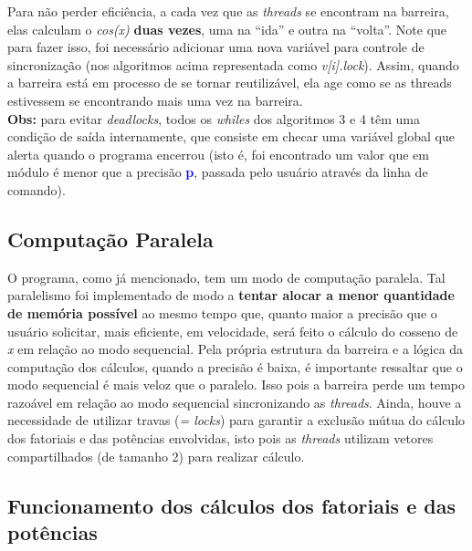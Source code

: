 \documentclass[11pt]{article}
\newcommand{\quotes}[1]{``#1''}
\begin{document}
Para não perder eficiência, a cada vez que as \textit{threads} se encontram na barreira, elas calculam o \textit{cos(x)} \textbf{duas vezes}, uma na \quotes{ida} e outra na \quotes{volta}. Note que para fazer isso, foi necessário adicionar uma nova variável para controle de sincronização (nos algoritmos acima representada como \textit{v[i].lock}). Assim, quando a barreira está em processo de se tornar reutilizável, ela age como se as threads estivessem se encontrando mais uma vez na barreira. \\
\textbf{Obs:} para evitar \textit{deadlocks}, todos os \textit{whiles} dos algoritmos 3 e 4 têm uma condição de saída internamente, que consiste em checar uma variável global que alerta quando o programa encerrou (isto é, foi encontrado um valor que em módulo é menor que a precisão \textbf{\textcolor{blue}{p}}, passada pelo usuário através da linha de comando).


\subsection{Computação Paralela}

O programa, como já mencionado, tem um modo de computação paralela. Tal paralelismo foi implementado de modo a \textbf{tentar alocar a menor quantidade de memória possível} ao mesmo tempo que, quanto maior a precisão que o usuário solicitar, mais eficiente, em velocidade, será feito o cálculo do cosseno de \textit{x} em relação ao modo sequencial. Pela própria estrutura da barreira e a lógica da computação dos cálculos, quando a precisão é baixa, é importante ressaltar que o modo sequencial é mais veloz que o paralelo. Isso pois a barreira perde um tempo razoável em relação ao modo sequencial sincronizando as \textit{threads}. Ainda, houve a necessidade de utilizar travas (\textit{= locks}) para garantir a exclusão mútua do cálculo dos fatoriais e das potências envolvidas, isto pois as \textit{threads} utilizam vetores compartilhados (de tamanho 2) para realizar cálculo.

\subsection{Funcionamento dos cálculos dos fatoriais e das potências}
\end{document}
